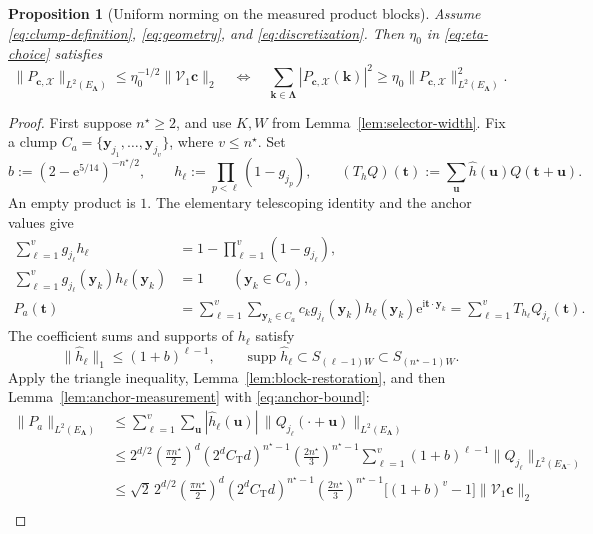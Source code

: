 \documentclass[11pt]{article}
\newtheorem{proposition}{Proposition}
\newcommand{\V}{\mathcal V}
\newcommand{\X}{\mathcal X}
\newcommand{\ii}{\mathrm i}
\begin{document}
\begin{proposition}[Uniform norming on the measured product blocks]\label{prop:uniform-norming}
Assume \eqref{eq:clump-definition}, \eqref{eq:geometry}, and \eqref{eq:discretization}. Then $\eta_0$ in \eqref{eq:eta-choice} satisfies
\begin{equation}\label{eq:norming}
\|P_{\bm c,\X}\|_{L^2(E_{\bm\Lambda})}\le\eta_0^{-1/2}\|\V_1\bm c\|_2\quad\Longleftrightarrow\quad\sum_{\bm k\in\bm\Lambda}|P_{\bm c,\X}(\bm k)|^2\ge\eta_0\|P_{\bm c,\X}\|_{L^2(E_{\bm\Lambda})}^2.
\end{equation}
\end{proposition}
\begin{proof}
First suppose $n^\star\ge2$, and use $K,W$ from Lemma~\ref{lem:selector-width}. Fix a clump $C_a=\{\bm y_{j_1},\ldots,\bm y_{j_v}\}$, where $v\le n^\star$. Set
\[
b:=\left(2-\mathrm e^{5/14}\right)^{-n^\star/2},\qquad h_\ell:=\prod_{p<\ell}(1-g_{j_p}),\qquad (T_hQ)(\bm t):=\sum_{\bm u}\widehat h(\bm u)Q(\bm t+\bm u).
\]
An empty product is $1$. The elementary telescoping identity and the anchor values give
\begin{align*}
\sum_{\ell=1}^v g_{j_\ell}h_\ell&=1-\prod_{\ell=1}^v(1-g_{j_\ell}),\\
\sum_{\ell=1}^v g_{j_\ell}(\bm y_k)h_\ell(\bm y_k)&=1\qquad(\bm y_k\in C_a),\\
P_a(\bm t)&=\sum_{\ell=1}^v\sum_{\bm y_k\in C_a}c_k g_{j_\ell}(\bm y_k)h_\ell(\bm y_k)\mathrm e^{\ii\bm t\cdot\bm y_k}=\sum_{\ell=1}^v T_{h_\ell}Q_{j_\ell}(\bm t).
\end{align*}
The coefficient sums and supports of $h_\ell$ satisfy
\[
\|\widehat h_\ell\|_1\le(1+b)^{\ell-1},\qquad \operatorname{supp}\widehat h_\ell\subset S_{(\ell-1)W}\subset S_{(n^\star-1)W}.
\]
Apply the triangle inequality, Lemma~\ref{lem:block-restoration}, and then Lemma~\ref{lem:anchor-measurement} with \eqref{eq:anchor-bound}:
\begin{align*}
\|P_a\|_{L^2(E_{\bm\Lambda})}&\le\sum_{\ell=1}^v\sum_{\bm u}|\widehat h_\ell(\bm u)|\,\|Q_{j_\ell}(\cdot+\bm u)\|_{L^2(E_{\bm\Lambda})}\\
&\le2^{d/2}\left(\frac{\pi n^\star}{2}\right)^d(2^dC_{\mathrm T}d)^{n^\star-1}\left(\frac{2n^\star}{3}\right)^{n^\star-1}\sum_{\ell=1}^v(1+b)^{\ell-1}\|Q_{j_\ell}\|_{L^2(E_{\bm\Lambda^-})}\\
&\le\sqrt2\,2^{d/2}\left(\frac{\pi n^\star}{2}\right)^d(2^dC_{\mathrm T}d)^{n^\star-1}\left(\frac{2n^\star}{3}\right)^{n^\star-1}\bigl[(1+b)^v-1\bigr]\|\V_1\bm c\|_2\\

\end{align*}
\end{proof}
\end{document}

